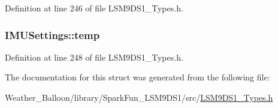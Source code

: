 Definition at line 246 of file L\+S\+M9\+D\+S1\+\_\+\+Types.\+h.

\subsubsection[{\texorpdfstring{temp}{temp}}]{ I\+M\+U\+Settings\+::temp}\hypertarget{struct_i_m_u_settings_a55a77555f1843c186db02080078632f2}{}\label{struct_i_m_u_settings_a55a77555f1843c186db02080078632f2}


Definition at line 248 of file L\+S\+M9\+D\+S1\+\_\+\+Types.\+h.



The documentation for this struct was generated from the following file\+:\begin{DoxyCompactItemize}
\item 
Weather\+\_\+\+Balloon/library/\+Spark\+Fun\+\_\+\+L\+S\+M9\+D\+S1/src/\hyperlink{_l_s_m9_d_s1___types_8h}{L\+S\+M9\+D\+S1\+\_\+\+Types.\+h}\end{DoxyCompactItemize}

